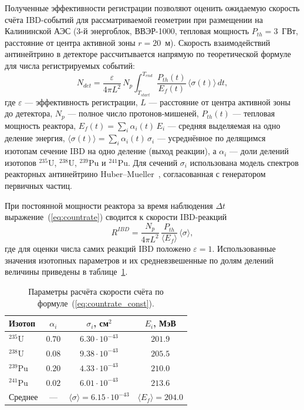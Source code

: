 \documentclass[a4paper,12pt]{extarticle}
\begin{document}
Полученные эффективности регистрации позволяют оценить ожидаемую скорость счёта IBD-событий для рассматриваемой геометрии при размещении на Калининской АЭС (3-й энергоблок, ВВЭР-1000, тепловая мощность $P_{th}=3$~ГВт, расстояние от центра активной зоны $r=20$~м). Скорость взаимодействий антинейтрино в детекторе рассчитывается напрямую по теоретической формуле для числа регистрируемых событий:
\begin{equation}
    N_{det}=\frac{\varepsilon}{4\pi L^2}\,N_p\int_{T_{start}}^{T_{end}}\frac{P_{th}(t)}{E_f(t)}\,\langle\sigma(t)\rangle\,dt,
    \label{eq:countrate}
\end{equation}
где $\varepsilon$ --- эффективность регистрации, $L$ --- расстояние от центра активной зоны до детектора, $N_p$ --- полное число протонов-мишеней, $P_{th}(t)$ --- тепловая мощность реактора, $E_f(t)=\sum_i\alpha_i(t)\,E_i$ --- средняя выделяемая на одно деление энергия, $\langle\sigma(t)\rangle=\sum_i\alpha_i(t)\,\sigma_i$ --- усреднённое по делящимся изотопам сечение IBD на одно деление (выход реакции), а $\alpha_i$ --- доли делений изотопов $^{235}$U, $^{238}$U, $^{239}$Pu и $^{241}$Pu. Для сечений $\sigma_i$ использована модель спектров реакторных антинейтрино Huber–Mueller~\cite{huber2011,mueller2011}, согласованная с генератором первичных частиц.

При постоянной мощности реактора за время наблюдения $\Delta t$ выражение~(\ref{eq:countrate}) сводится к скорости IBD-реакций
\begin{equation}
    R^{IBD}=\frac{N_p}{4\pi L^2}\,\frac{P_{th}}{\langle E_f\rangle}\,\langle\sigma\rangle,
    \label{eq:countrate_const}
\end{equation}
где для оценки числа самих реакций IBD положено $\varepsilon=1$. Использованные значения изотопных параметров и их средневзвешенные по долям делений величины приведены в таблице~\ref{tab:rate_params}.

\begin{table}[h]
\centering
\caption{Параметры расчёта скорости счёта по формуле~(\ref{eq:countrate_const}).}
\label{tab:rate_params}
\begin{tabular}{lccc}
\toprule
Изотоп & $\alpha_i$ & $\sigma_i$, см$^2$ & $E_i$, МэВ \\
\midrule
$^{235}$U  & $0.70$ & $6.30\cdot 10^{-43}$ & $201.9$ \\
$^{238}$U  & $0.08$ & $9.38\cdot 10^{-43}$ & $205.5$ \\
$^{239}$Pu & $0.20$ & $4.33\cdot 10^{-43}$ & $210.0$ \\
$^{241}$Pu & $0.02$ & $6.01\cdot 10^{-43}$ & $213.6$ \\
\midrule
Среднее & --- & $\langle\sigma\rangle=6.15\cdot 10^{-43}$ & $\langle E_f\rangle=204.0$ \\
\bottomrule
\end{tabular}
\end{table}
\end{document}
